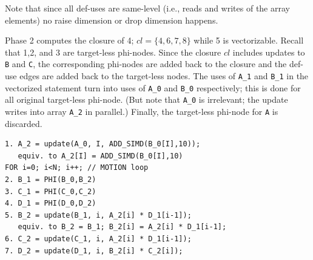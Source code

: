 \documentclass[sigconf, screen, natbib=false, dvipsnames, table]{acmart}
\theoremstyle{definition}
\begin{document}
Note that since all def-uses are same-level (i.e., reads and writes of the array elements) 
no raise dimension or drop dimension happens.

Phase 2 computes the closure of 4; $cl = \{4,6,7, 8\}$ 
while 5 is vectorizable. Recall that 1,2, and 3 are target-less phi-nodes. Since the closure $cl$ includes updates to \texttt{B} and \texttt{C},
the corresponding phi-nodes are added back to the closure and the def-use edges are added back to the target-less nodes. The uses of \texttt{A\_1} and \texttt{B\_1} in the vectorized statement
turn into uses of \texttt{A\_0} and \texttt{B\_0} respectively; this is done for all original target-less phi-node. (But note that \texttt{A\_0} is irrelevant; the update writes into array \texttt{A\_2} in parallel.)
Finally, the target-less phi-node for \texttt{A} is discarded. 

{\small
\begin{verbatim}
1. A_2 = update(A_0, I, ADD_SIMD(B_0[I],10));
   equiv. to A_2[I] = ADD_SIMD(B_0[I],10)
FOR i=0; i<N; i++; // MOTION loop
2. B_1 = PHI(B_0,B_2)
3. C_1 = PHI(C_0,C_2)
4. D_1 = PHI(D_0,D_2)
5. B_2 = update(B_1, i, A_2[i] * D_1[i-1]);
   equiv. to B_2 = B_1; B_2[i] = A_2[i] * D_1[i-1];
6. C_2 = update(C_1, i, A_2[i] * D_1[i-1]);
7. D_2 = update(D_1, i, B_2[i] * C_2[i]);
\end{verbatim}
}
\end{document}
